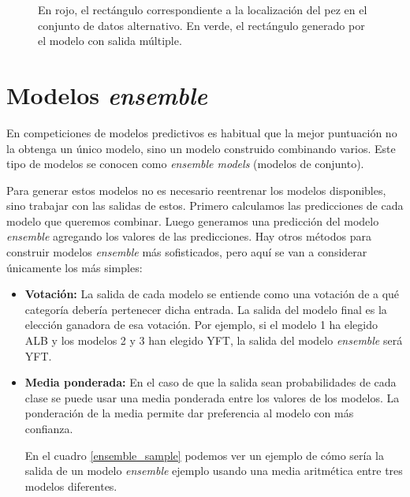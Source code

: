 \begin{figure}
  \caption{En rojo, el rectángulo correspondiente a la localización del pez en
  el conjunto de datos alternativo. En verde, el rectángulo generado por el
  modelo con salida múltiple.}
\label{predicted_boxes_1}
\end{figure}


\section{Modelos \textit{ensemble}}

En competiciones de modelos predictivos es habitual que la mejor puntuación
no la obtenga un único modelo, sino un modelo construido combinando varios. Este
tipo de modelos se conocen como \textit{ensemble models} (modelos de conjunto).

Para generar estos modelos no es necesario reentrenar los modelos disponibles,
sino trabajar con las salidas de estos. Primero calculamos las predicciones de
cada modelo que queremos combinar. Luego generamos una predicción del modelo
\textit{ensemble} agregando los valores de las predicciones. Hay otros métodos
para construir modelos \textit{ensemble} más sofisticados, pero aquí se van a
considerar únicamente los más simples:

\begin{itemize}
    \item{\textbf{Votación:} La salida de cada modelo se entiende como una
            votación de a qué categoría debería pertenecer dicha entrada. La
            salida del modelo final es la elección ganadora de esa votación. Por
            ejemplo, si el modelo 1 ha elegido ALB y los modelos 2 y 3 han
        elegido YFT, la salida del modelo \textit{ensemble} será YFT.}
    \item{\textbf{Media ponderada:} En el caso de que la salida sean
            probabilidades de cada clase se puede  usar una media ponderada
            entre los valores de los modelos. La ponderación de la media permite
            dar preferencia al modelo con más confianza.
            
            En el cuadro \ref{ensemble_sample} podemos ver un ejemplo de cómo
        sería la salida de un modelo \textit{ensemble} ejemplo usando una media
    aritmética entre tres modelos diferentes.}
\end{itemize}

